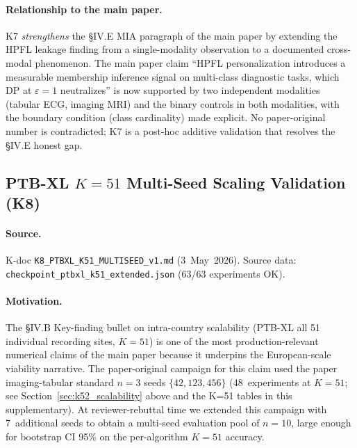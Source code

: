 \documentclass[conference]{IEEEtran}
\begin{document}
\paragraph{Relationship to the main paper.} K7 \emph{strengthens} the §IV.E MIA paragraph of the main paper by extending the HPFL leakage finding from a single-modality observation to a documented cross-modal phenomenon. The main paper claim ``HPFL personalization introduces a measurable membership inference signal on multi-class diagnostic tasks, which DP at $\varepsilon{=}1$ neutralizes'' is now supported by two independent modalities (tabular ECG, imaging MRI) and the binary controls in both modalities, with the boundary condition (class cardinality) made explicit. No paper-original number is contradicted; K7 is a post-hoc additive validation that resolves the §IV.E honest gap.


\subsection{PTB-XL $K{=}51$ Multi-Seed Scaling Validation (K8)}
\label{sec:s-prerebuttal-8}

\paragraph{Source.} K-doc \texttt{K8\_PTBXL\_K51\_MULTISEED\_v1.md} (3~May~2026). Source data: \texttt{checkpoint\_ptbxl\_k51\_extended.json} (63/63 experiments OK).

\paragraph{Motivation.} The §IV.B Key-finding bullet on intra-country scalability (PTB-XL all 51 individual recording sites, $K{=}51$) is one of the most production-relevant numerical claims of the main paper because it underpins the European-scale viability narrative. The paper-original campaign for this claim used the paper imaging-tabular standard $n{=}3$ seeds $\{42, 123, 456\}$ (48~experiments at $K{=}51$; see Section~\ref{sec:k52_scalability} above and the K=51 tables in this supplementary). At reviewer-rebuttal time we extended this campaign with 7~additional seeds to obtain a multi-seed evaluation pool of $n{=}10$, large enough for bootstrap CI 95\% on the per-algorithm $K{=}51$ accuracy.
\end{document}

